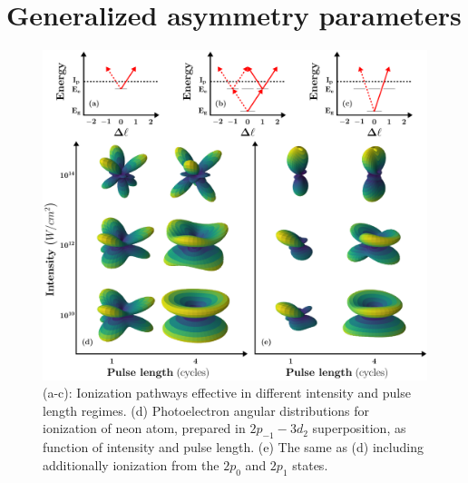 \section*{Generalized asymmetry parameters}

\begin{figure}[t]
\begin{center}
    \includegraphics[width=0.9\linewidth]{figs/Photo_ionization/GAP/combine_fig_1.pdf}
\end{center}
\caption{
(a-c): Ionization pathways effective in different intensity and pulse length regimes. (d) Photoelectron angular distributions for ionization of neon atom, prepared in $2p_{-1}-3d_2$ superposition, as function of intensity and pulse length. (e) The same as (d) including additionally ionization from the $2p_0$ and $2p_1$ states.
} 
  \label{fig:scheme}
\end{figure}

